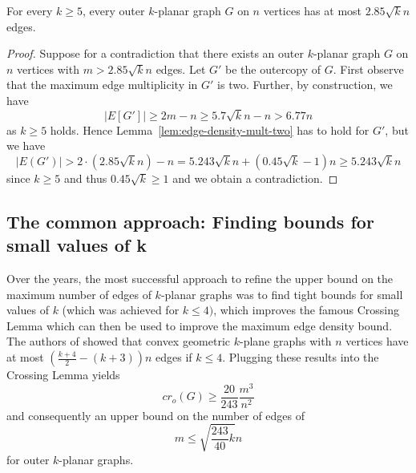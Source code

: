 \documentclass[nolineno,a4paper,USenglish,cleveref,autoref,thm-restate]
{socg}
\begin{document}
\begin{theorem}
For every $k \geq 5$, every outer $k$-planar graph $G$ on $n$ vertices has at most $2.85\sqrt{k}n$ edges.
\end{theorem}
\begin{proof}
Suppose for a contradiction that there exists an outer $k$-planar graph $G$ on $n$ vertices with $m > 2.85\sqrt{k}n$ edges.
Let $G'$ be the outercopy of $G$.
First observe that the maximum edge multiplicity in $G'$ is two. Further, by construction, we have 
\[|E[G']| \geq 2m-n \geq 5.7\sqrt{k}n - n > 6.77n \]
as $k \geq 5$ holds.
Hence Lemma~\ref{lem:edge-density-mult-two} has to hold for $G'$, but we have
\[|E(G')| > 2\cdot(2.85\sqrt{k}n)-n = 5.243\sqrt{k}n +(0.45\sqrt{k} - 1)n \geq 5.243\sqrt{k}n\]
since $k\geq 5$ and thus $0.45\sqrt{k} \geq 1$ and we obtain a contradiction.
\end{proof}

\subsection{The common approach: Finding bounds for small values of k}\label{sec:small-values}
Over the years, the most successful approach to refine the upper bound on the maximum number of edges of $k$-planar graphs was to find tight bounds for small values of $k$ (which was achieved for $k \leq 4)$, which improves the famous Crossing Lemma which can then be used to improve the maximum edge density bound.
The authors of \cite{DBLP:conf/compgeom/AichholzerOOPSS22} showed that convex geometric $k$-plane graphs with $n$ vertices have at most $(\frac{k+4}{2}-(k+3))n$ edges if $k \leq 4$.
Plugging these results into the Crossing Lemma yields
\[cr_o(G) \geq \frac{20}{243}\frac{m^3}{n^2}\] and consequently an upper bound on the number of edges of 
\[m \leq \sqrt{\frac{243}{40}k}n\]
for outer $k$-planar graphs.
\end{document}

